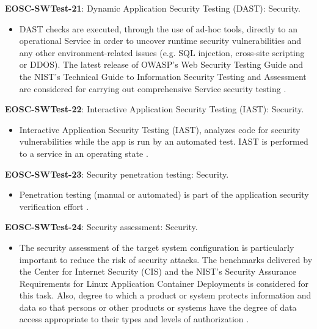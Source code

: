 \textbf{EOSC-SWTest-21}: Dynamic Application Security Testing (DAST): Security.

\begin{itemize}
    \item DAST checks are executed, through the use of ad-hoc tools, directly to an operational Service in order to uncover runtime security vulnerabilities and any other environment-related issues (e.g. SQL injection, cross-site scripting or DDOS). The latest release of OWASP's Web Security Testing Guide and the NIST's Technical Guide to Information Security Testing and Assessment are considered for carrying out comprehensive Service security testing \cite{orviz_fernandez_eosc-synergy_2020}.
\end{itemize}

\textbf{EOSC-SWTest-22}: Interactive Application Security Testing (IAST): Security.

\begin{itemize}
    \item Interactive Application Security Testing (IAST), analyzes code for security vulnerabilities while the app is run by an automated test. IAST is performed to a service in an operating state \cite{orviz_fernandez_eosc-synergy_2020}.
\end{itemize}

\textbf{EOSC-SWTest-23}: Security penetration testing: Security.

\begin{itemize}
    \item Penetration testing (manual or automated) is part of the application security verification effort \cite{orviz_fernandez_eosc-synergy_2020}.
\end{itemize}

\textbf{EOSC-SWTest-24}: Security assessment: Security.

\begin{itemize}
    \item The security assessment of the target system configuration is particularly important to reduce the risk of security attacks. The benchmarks delivered by the Center for Internet Security (CIS) and the NIST's Security Assurance Requirements for Linux Application Container Deployments is considered for this task. Also, degree to which a product or system protects information and data so that persons or other products or systems have the degree of data access appropriate to their types and levels of authorization \cite{iso_25010_2011_2017,orviz_fernandez_eosc-synergy_2020}.
\end{itemize}

